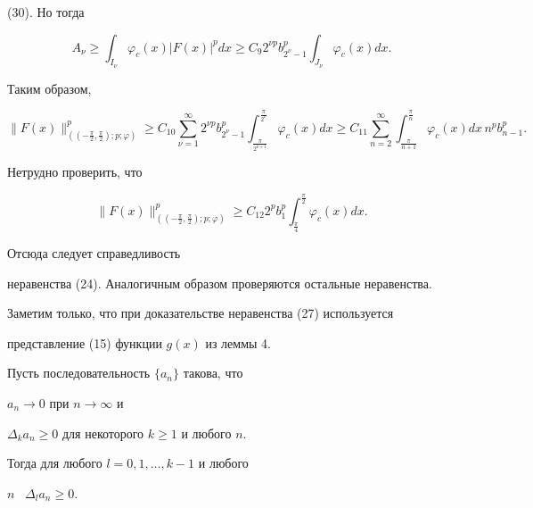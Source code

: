 \begin{pf}
(30). Но тогда


$$


A_\nu \geq \int_{I_\nu} 


\varphi_c(x) |F(x) |^p dx \geq C_9 2^{\nu p}


b_{2^\nu - 1}^p \int_{J_\nu} \varphi_c(x) dx.


$$


Таким образом, 


$$


\| F(x)\| ^p_{((-\frac{\pi}{2},\frac{\pi}{2});p;\varphi )}


\geq C_{10} \sum\limits_{\nu=1}^{\infty} 2^{\nu p} b_{2^\nu - 1}^p


\int_{\frac{\pi}{2^{\nu+1}}}^{\frac{\pi}{2^\nu}}\varphi _c(x) dx \geq 


C_{11} \sum\limits_{n=2}^{\infty} \int_{\frac{\pi}{n+1}}^{\frac{\pi}{n}}


\varphi_c(x) dx\,n^p b_{n-1}^p.


$$


Нетрудно проверить, что 


$$


\| F(x)\| ^p_{((-\frac{\pi}{2},


\frac{\pi}{2});p;\varphi )}


\geq C_{12} 2^p b_1^p \int_{\frac{\pi}{4}}^{\frac{\pi}{2}} 


\varphi_c(x) dx.


$$


Отсюда следует справедливость


неравенства (24). Аналогичным образом проверяются остальные неравенства.


Заметим только, что при доказательстве неравенства (27) используется


представление (15) функции $g(x)$ из леммы 4.


\end{pf}





\begin{lem}


Пусть последовательность $\{a_n\}$ такова, что


$a_n \to 0$ при $n \to \infty$ и


$ \Delta_k a_n \geq 0 $ для некоторого $k \geq 1$ и любого $n$.


Тогда для любого $l=0,1, \dotsc, k-1$ и любого


$n$ \ $\Delta_l a_n \geq 0 $.


\end{lem}





